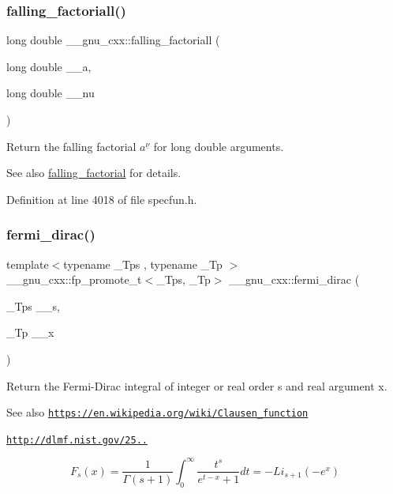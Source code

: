 \subsubsection{\texorpdfstring{falling\+\_\+factoriall()}{falling\_factoriall()}}
{\footnotesize\ttfamily long double \+\_\+\+\_\+gnu\+\_\+cxx\+::falling\+\_\+factoriall (\begin{DoxyParamCaption}\item[{long double}]{\+\_\+\+\_\+a,  }\item[{long double}]{\+\_\+\+\_\+nu }\end{DoxyParamCaption})\hspace{0.3cm}{\ttfamily [inline]}}

Return the falling factorial $ a^{\underline{\nu}} $ for {\ttfamily  long double } arguments.

\begin{DoxySeeAlso}{See also}
\hyperlink{group__gnu__math__spec__func_ga3cc8eb6068c7155ec48b40e20160c5c0}{falling\+\_\+factorial} for details. 
\end{DoxySeeAlso}


Definition at line 4018 of file specfun.\+h.

\mbox{\label{group__gnu__math__spec__func_ga5468fbaed5cb8384cff7cfb9d2188d1a}} 
\subsubsection{\texorpdfstring{fermi\+\_\+dirac()}{fermi\_dirac()}}
{\footnotesize\ttfamily template$<$typename \+\_\+\+Tps , typename \+\_\+\+Tp $>$ \\
\+\_\+\+\_\+gnu\+\_\+cxx\+::fp\+\_\+promote\+\_\+t$<$\+\_\+\+Tps, \+\_\+\+Tp$>$ \+\_\+\+\_\+gnu\+\_\+cxx\+::fermi\+\_\+dirac (\begin{DoxyParamCaption}\item[{\+\_\+\+Tps}]{\+\_\+\+\_\+s,  }\item[{\+\_\+\+Tp}]{\+\_\+\+\_\+x }\end{DoxyParamCaption})\hspace{0.3cm}{\ttfamily [inline]}}

Return the Fermi-\/\+Dirac integral of integer or real order s and real argument x. \begin{DoxySeeAlso}{See also}
\href{https://en.wikipedia.org/wiki/Clausen_function}{\tt https\+://en.\+wikipedia.\+org/wiki/\+Clausen\+\_\+function} 

\href{http://dlmf.nist.gov/25.12.16}{\tt http\+://dlmf.\+nist.\+gov/25..}
\end{DoxySeeAlso}
\[ F_s(x) = \frac{1}{\Gamma(s+1)}\int_0^\infty \frac{t^s}{e^{t-x} + 1}dt = -Li_{s+1}(-e^x) \]


